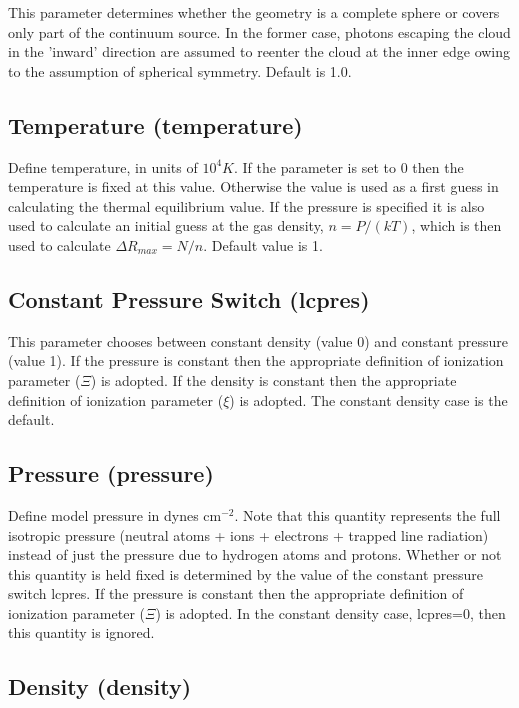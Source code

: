 This parameter determines whether the geometry is a complete sphere or
covers only part of the continuum source.  In the former case, photons 
escaping the cloud in the 'inward' direction are assumed to reenter the 
cloud at the inner edge owing to the assumption of spherical symmetry.
Default is 1.0.

\subsection{Temperature (temperature)}   

Define temperature, in units of $10^4 K$.  If the parameter 
 is set to 0 then the temperature is fixed at this
value.  Otherwise the value is used as a first guess in calculating the 
thermal equilibrium value.  If the pressure is specified it is also used 
to calculate an initial guess at the gas density, $n=P/(kT)$, 
which is then used to calculate $\Delta R_{max}=N/n$.  Default value is 1.

\subsection{Constant Pressure Switch (lcpres)}

This parameter chooses between constant density (value 0) and constant 
pressure (value 1).
 If the pressure is constant then  the appropriate definition 
of ionization parameter ($\Xi$) is adopted.
If the density is constant then  the appropriate definition 
of ionization parameter ($\xi$) is adopted.
The constant density case is the default.

\subsection{Pressure (pressure)}

Define model pressure in dynes cm$^{-2}$.  Note that this quantity 
represents the full isotropic pressure (neutral atoms + ions + electrons
+ trapped line radiation) instead of just the pressure due to hydrogen
atoms and protons.  Whether or not this quantity is  held fixed  is determined 
by the value of the constant pressure switch lcpres. 
 If the pressure is constant then  the appropriate definition 
of ionization parameter ($\Xi$) is adopted.  In the constant density case, 
lcpres=0, then this quantity is ignored.

\subsection{Density (density)}     

